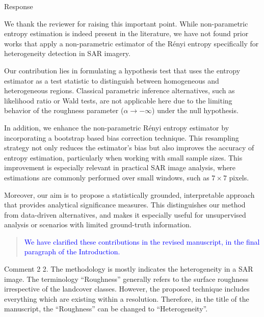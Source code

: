 \documentclass[11pt]{report}
\begin{document}
\begin{responsebox}{Response}


We thank the reviewer for raising this important point. While non-parametric entropy estimation is indeed present in the literature, we have not found prior works that apply a non-parametric estimator of the Rényi entropy specifically for heterogeneity detection in SAR imagery.

Our contribution lies in formulating a hypothesis test that uses the entropy estimator as a test statistic to distinguish between homogeneous and heterogeneous regions. Classical parametric inference alternatives, such as likelihood ratio or Wald tests, are not applicable here due to the limiting behavior of the roughness parameter (\(\alpha \to -\infty\)) under the null hypothesis.

In addition, we enhance the non-parametric Rényi entropy estimator by incorporating a bootstrap based bias correction technique. This resampling strategy not only reduces the estimator’s bias but also improves the accuracy of entropy estimation, particularly when working with small sample sizes. This improvement is especially relevant in practical SAR image analysis, where estimations are commonly performed over small windows, such as \(7 \times 7\) pixels.

Moreover, our aim is to propose a statistically grounded, interpretable approach that provides analytical significance measures. This distinguishes our method from data-driven alternatives, and makes it especially useful for unsupervised analysis or scenarios with limited ground-truth information.



\begin{quote}
	\textcolor{blue}{ We have clarified these contributions in the revised manuscript, in the final paragraph of the Introduction.}
\end{quote}

\end{responsebox}

\vspace{1em}
\begin{reviewbox}{Comment 2}
2. The methodology is mostly indicates the heterogeneity in a SAR image. The terminology ``Roughness'' generally refers to the surface roughness irrespective of the landcover classes. However, the proposed technique includes everything which are existing within a resolution. Therefore, in the title of the manuscript, the ``Roughness'' can be changed to ``Heterogeneity''.
\end{reviewbox}
\end{document}

